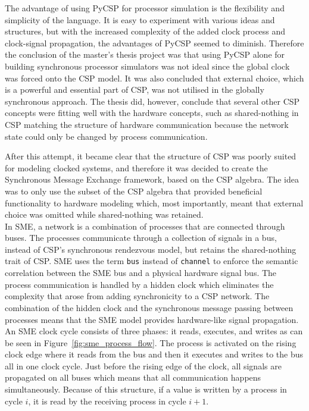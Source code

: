 The advantage of using PyCSP for processor simulation is the flexibility and simplicity of the language. It is easy to experiment with various ideas and structures, but with the increased complexity of the added clock process and clock-signal propagation, the advantages of PyCSP seemed to diminish. Therefore the conclusion of the master's thesis project was that using PyCSP alone for building synchronous processor simulators was not ideal since the global clock was forced onto the CSP model. It was also concluded that external choice, which is a powerful and essential part of CSP, was not utilised in the globally synchronous approach. The thesis did, however, conclude that several other CSP concepts were fitting well with the hardware concepts, such as shared-nothing in CSP matching the structure of hardware communication because the network state could only be changed by process communication.

After this attempt, it became clear that the structure of CSP was poorly suited for modeling clocked systems, and therefore it was decided to create the Synchronous Message Exchange framework, based on the CSP algebra. The idea was to only use the subset of the CSP algebra that provided beneficial functionality to hardware modeling which, most importantly, meant that external choice was omitted while shared-nothing was retained.
\\

In SME, a network is a combination of processes that are connected through buses. The processes communicate through a collection of signals in a bus, instead of CSP's synchronous rendezvous model, but retains the shared-nothing trait of CSP.
SME uses the term \texttt{bus} instead of \texttt{channel} to enforce the semantic correlation between the SME bus and a physical hardware signal bus.
The process communication is handled by a hidden clock which eliminates the complexity that arose from adding synchronicity to a CSP network. The combination of the hidden clock and the synchronous message passing between processes means that the SME model provides hardware-like signal propagation.
An SME clock cycle consists of three phases: it reads, executes, and writes as can be seen in Figure~\ref{fig:sme_process_flow}. The process is activated on the rising clock edge where it reads from the bus and then it executes and writes to the bus all in one clock cycle. Just before the rising edge of the clock, all signals are propagated on all buses which means that all communication happens simultaneously. Because of this structure, if a value is written by a process in cycle $i$, it is read by the receiving process in cycle $i+1$.\\

